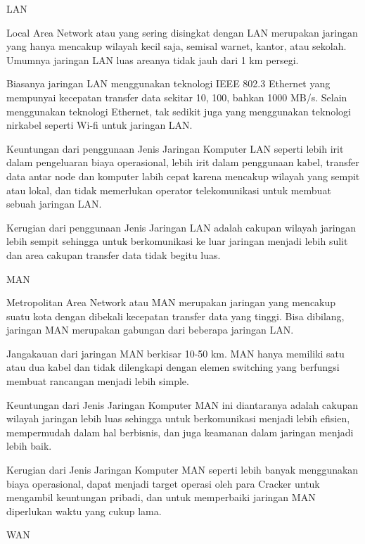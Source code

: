 \documentclass{wileySix}
\begin{document}
\noindent 
\begin{myEnumerate}
	\item LAN \par
	Local Area Network atau yang sering disingkat dengan LAN merupakan jaringan yang hanya mencakup wilayah kecil saja, semisal warnet, kantor, atau sekolah. Umumnya jaringan LAN luas areanya tidak jauh dari 1 km persegi. \par
	\vspace{12pt}
	Biasanya jaringan LAN menggunakan teknologi IEEE 802.3 Ethernet yang mempunyai kecepatan transfer data sekitar 10, 100, bahkan 1000 MB/s. Selain menggunakan teknologi Ethernet, tak sedikit juga yang menggunakan teknologi nirkabel seperti Wi-fi untuk jaringan LAN. \par
	\vspace{12pt}
	Keuntungan dari penggunaan Jenis Jaringan Komputer LAN seperti lebih irit dalam pengeluaran biaya operasional, lebih irit dalam penggunaan kabel, transfer data antar node dan komputer labih cepat karena mencakup wilayah yang sempit atau lokal, dan tidak memerlukan operator telekomunikasi untuk membuat sebuah jaringan LAN. \par
	Kerugian dari penggunaan Jenis Jaringan LAN adalah cakupan wilayah jaringan lebih sempit sehingga untuk berkomunikasi ke luar jaringan menjadi lebih sulit dan area cakupan transfer data tidak begitu luas. \par
	\vspace{12pt}
	\noindent 
	\item MAN \par
	Metropolitan Area Network atau MAN merupakan jaringan yang mencakup suatu kota dengan dibekali kecepatan transfer data yang tinggi. Bisa dibilang, jaringan MAN merupakan gabungan dari beberapa jaringan LAN. \par
	\vspace{12pt}
	Jangakauan dari jaringan MAN berkisar 10-50 km. MAN hanya memiliki satu atau dua kabel dan tidak dilengkapi dengan elemen switching yang berfungsi membuat rancangan menjadi lebih simple. \par
	\vspace{12pt}
	Keuntungan dari Jenis Jaringan Komputer MAN ini diantaranya adalah cakupan wilayah jaringan lebih luas sehingga untuk berkomunikasi menjadi lebih efisien, mempermudah dalam hal berbisnis, dan juga keamanan dalam jaringan menjadi lebih baik. \par
	\vspace{12pt}
	Kerugian dari Jenis Jaringan Komputer MAN seperti lebih banyak menggunakan biaya operasional, dapat menjadi target operasi oleh para Cracker untuk mengambil keuntungan pribadi, dan untuk memperbaiki jaringan MAN diperlukan waktu yang cukup lama. \par
	\vspace{12pt}
	\noindent 
	\item WAN\end{myEnumerate}
\end{document}
